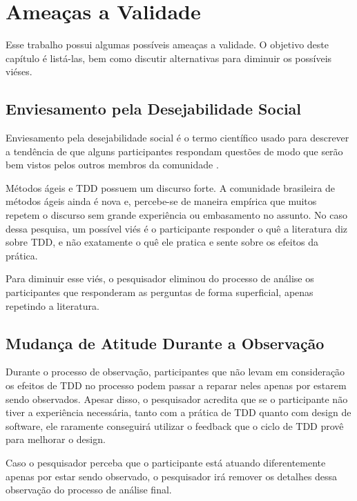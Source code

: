 \chapter{Ameaças a Validade}
\label{cap:ameacas}

Esse trabalho possui algumas possíveis ameaças a validade. O objetivo
deste capítulo é listá-las, bem como discutir alternativas para diminuir
os possíveis viéses.

\section{Enviesamento pela Desejabilidade Social}

Enviesamento pela desejabilidade social é o termo científico usado para descrever
a tendência de que alguns participantes respondam questões de modo que serão
bem vistos pelos outros membros da comunidade \cite{crowne}.

Métodos ágeis e TDD possuem um discurso forte. A comunidade brasileira de métodos
ágeis ainda é nova e, percebe-se de maneira empírica que muitos repetem o discurso
sem grande experiência ou embasamento no assunto.
No caso dessa pesquisa, um possível viés é o participante responder o quê
a literatura diz sobre TDD, e não exatamente o quê ele pratica e sente sobre
os efeitos da prática. 

Para diminuir esse viés, o pesquisador eliminou do processo de análise os participantes
que responderam as perguntas de forma superficial, apenas repetindo a literatura.

\section{Mudança de Atitude Durante a Observação}

Durante o processo de observação, participantes que não levam em consideração os efeitos
de TDD no processo podem passar a reparar neles apenas por estarem sendo observados.
Apesar disso, o pesquisador acredita que se o participante não tiver a experiência necessária,
tanto com a prática de TDD quanto com design de software, ele raramente conseguirá utilizar
o feedback que o ciclo de TDD provê para melhorar o design.

Caso o pesquisador perceba que o participante está atuando diferentemente apenas por
estar sendo observado, o pesquisador irá remover os detalhes dessa observação do
processo de análise final.

